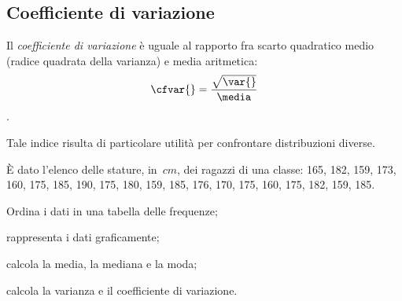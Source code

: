 \subsection{Coefficiente di variazione}

\begin{definizione}
Il \emph{coefficiente di variazione} è uguale al rapporto fra scarto quadratico medio (radice quadrata
della varianza) e media aritmetica:
\[\cfvar{} = \frac{\sqrt{\var{}}}{\media}\].
\end{definizione}
Tale indice risulta di particolare utilità per confrontare distribuzioni diverse.

\begin{exrig}
 \begin{esempio}

È dato l'elenco delle stature, in~$\unit{cm}$, dei ragazzi di
una classe: 165, 182, 159, 173, 160, 175, 185, 190, 175, 180, 159, 185, 176, 170, 175, 160, 175, 182, 159, 185.

\begin{enumeratea}
\item Ordina i dati in una tabella delle frequenze;
\item rappresenta i dati graficamente;
\item calcola la media, la mediana e la moda;
\item calcola la varianza e il coefficiente di variazione.
\end{enumeratea}


\end{esempio}
\end{exrig}
